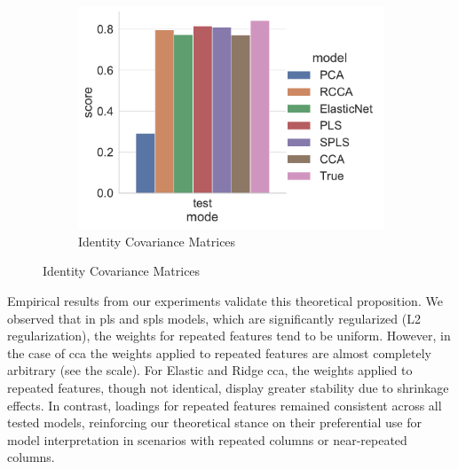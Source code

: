 \begin{figure}
\centering
\begin{subfigure}{0.49\linewidth}
\centering
\includegraphics[width=\linewidth]{figures/simulated/repeated/Train_Test_Scores_Identity_Covariance_implicit}
\caption{Identity Covariance Matrices}
\end{subfigure}
\end{figure}

Empirical results from our experiments validate this theoretical proposition.
We observed that in \acrshort{pls} and \acrshort{spls} models, which are significantly regularized (L2 regularization), the \gls{weights} for repeated features tend to be uniform.
However, in the case of \acrshort{cca} the \gls{weights} applied to repeated features are almost completely arbitrary (see the scale).
For Elastic and Ridge \acrshort{cca}, the \gls{weights} applied to repeated features, though not identical, display greater stability due to shrinkage effects.
In contrast, \gls{loadings} for repeated features remained consistent across all tested models, reinforcing our theoretical stance on their preferential use for model interpretation in scenarios with repeated columns or near-repeated columns.

%

